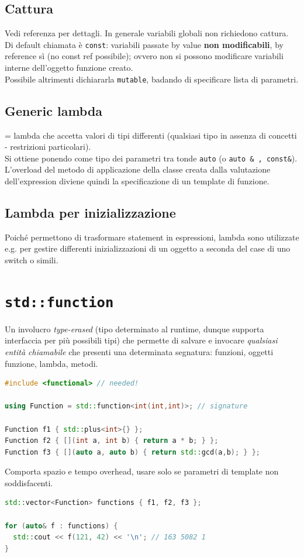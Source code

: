 \documentclass[10pt, oneside]{book}
\begin{document}
\subsection{Cattura}
Vedi referenza per dettagli. In generale variabili globali non richiedono cattura.
Di default chiamata è \texttt{const}: variabili passate by value \textbf{non modificabili}, by reference sì (no const ref possibile); ovvero non si possono modificare variabili interne dell'oggetto funzione creato.\\
Possibile altrimenti dichiararla \texttt{mutable}, badando di specificare lista di parametri.

\subsection{Generic lambda}
= lambda che accetta valori di tipi differenti (qualsiasi tipo in assenza di concetti - restrizioni particolari).\\
Si ottiene ponendo come tipo dei parametri tra tonde \texttt{auto} (o \texttt{auto \& , const\&}). L'overload del metodo di applicazione della classe creata dalla valutazione dell'expression diviene quindi la specificazione di un template di funzione.

\subsection{Lambda per inizializzazione}
Poiché permettono di trasformare statement in espressioni, lambda sono utilizzate e.g. per gestire differenti inizializzazioni di un oggetto a seconda del case di uno switch o simili. 

\section{\texttt{std::function}}
Un involucro \textit{type-erased} (tipo determinato al runtime, dunque supporta interfaccia per più possibili tipi) che permette di salvare e invocare \textit{qualsiasi entità chiamabile} che presenti una determinata segnatura: funzioni, oggetti funzione, lambda, metodi.\begin{lstlisting}[language=C++]
#include <functional> // needed!

using Function = std::function<int(int,int)>; // signature

Function f1 { std::plus<int>{} };
Function f2 { [](int a, int b) { return a * b; } };
Function f3 { [](auto a, auto b) { return std::gcd(a,b); } };
\end{lstlisting}
Comporta spazio e tempo overhead, usare solo se parametri di template non soddisfacenti.
\begin{lstlisting}[language=C++]
std::vector<Function> functions { f1, f2, f3 };

for (auto& f : functions) {
  std::cout << f(121, 42) << '\n'; // 163 5082 1
}
\end{lstlisting}
\end{document}
